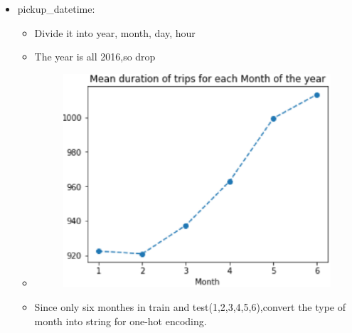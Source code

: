 \documentclass[
 size=14pt,
 paper=smartboard,  %
 mode=present, 		%
 display=slides, 	%
 style=tuliplab,  	%
 pauseslide,
 fleqn,leqno]{powerdot}
\begin{document}
\begin{slide}[toc=,bm=]{}
  \begin{itemize}
    \item pickup_datetime:
      \begin{itemize}
        \item Divide it into year, month, day, hour
        \item The year is all 2016,so drop
        \item \begin{figure}\includegraphics[scale=0.4]{figures/nine.eps}\end{figure}
        \item Since only six monthes in train and test(1,2,3,4,5,6),convert the type of month into string for one-hot encoding.
      \end{itemize}
  \end{itemize}
\end{slide}
\end{document}
